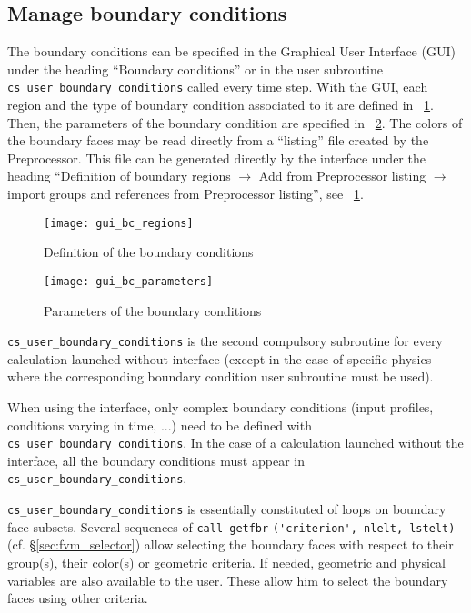 {{{\subsection{Manage boundary conditions}
\label{sec:prg_boundaryconditions}
The boundary conditions can be specified in the Graphical User Interface (GUI) under the heading ``Boundary conditions''
or in the user subroutine \texttt{cs\_user\_boundary\_conditions} called every time step.
With the GUI, each region and the type of boundary condition associated to it are defined in
\figurename~\ref{fig:gui_bc_regions}. Then, the parameters of the boundary condition are specified
 in \figurename~\ref{fig:gui_bc_parameters}. The colors of the boundary faces may be read directly from
a ``listing'' file created by the Preprocessor. This file can be generated directly by the interface
under the heading ``Definition of boundary regions $\rightarrow$ Add from Preprocessor listing $\rightarrow$ import groups and references from Preprocessor listing'', see \figurename~\ref{fig:gui_bc_regions}.
%
\begin{figure}[!ht]
\begin{center}
\texttt{[image: gui\_bc\_regions]}
\caption{Definition of the boundary conditions}
\label{fig:gui_bc_regions}
\end{center}
\end{figure}
%
\begin{figure}[!ht]
\begin{center}
\texttt{[image: gui\_bc\_parameters]}
\caption{Parameters of the boundary conditions}
\label{fig:gui_bc_parameters}
\end{center}
\end{figure}

\texttt{cs\_user\_boundary\_conditions} is the second compulsory subroutine for every calculation launched
without interface (except in the case of specific physics where the
corresponding boundary condition user subroutine must be used).

When using the interface, only complex boundary conditions (input profiles, conditions varying in time, ...)
need to be defined with \texttt{cs\_user\_boundary\_conditions}.
In the case of a calculation launched without the
interface, all the boundary conditions must appear in \texttt{cs\_user\_boundary\_conditions}.

\texttt{cs\_user\_boundary\_conditions} is essentially constituted of loops on boundary
face subsets. Several sequences
of \verb+call getfbr+ \verb+('criterion', nlelt, lstelt)+ (cf.
\S\ref{sec:fvm_selector}) allow selecting
the boundary faces with respect to their group(s), their
color(s) or geometric criteria. If needed, geometric and
physical variables are also available to the user. These allow him
to select the boundary faces using other criteria.

}}}
